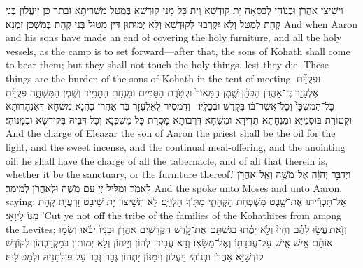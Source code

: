 {וִישֵׁיצֵי אַהֲרֹן וּבְנוֹהִי לְכַסָּאָה יָת קוּדְשָׁא וְיָת כָּל מָנֵי קוּדְשָׁא בְּמִטַּל מַשְׁרִיתָא וּבָתַר כֵּן יֵיעֲלוּן בְּנֵי קְהָת לְמִטַּל וְלָא יִקְרְבוּן לְקוּדְשָׁא וְלָא יְמוּתוּן דֵּין מַטוּל בְּנֵי קְהָת בְּמַשְׁכַּן זִמְנָא׃}
{And when Aaron and his sons have made an end of covering the holy furniture, and all the holy vessels, as the camp is to set forward—after that, the sons of Kohath shall come to bear them; but they shall not touch the holy things, lest they die. These things are the burden of the sons of Kohath in the tent of meeting.}{}
{וּפְקֻדַּ֞ת אֶלְעָזָ֣ר \legarmeh  בֶּן־אַהֲרֹ֣ן הַכֹּהֵ֗ן שֶׁ֤מֶן הַמָּאוֹר֙ וּקְטֹ֣רֶת הַסַּמִּ֔ים וּמִנְחַ֥ת הַתָּמִ֖יד וְשֶׁ֣מֶן הַמִּשְׁחָ֑ה פְּקֻדַּ֗ת כׇּל־הַמִּשְׁכָּן֙ וְכׇל־אֲשֶׁר־בּ֔וֹ בְּקֹ֖דֶשׁ וּבְכֵלָֽיו׃ \petucha 
{}}
{וְדִמְסִיר לְאֶלְעָזָר בַּר אַהֲרֹן כָּהֲנָא מִשְׁחָא דְּאַנְהָרוּתָא וּקְטוֹרֶת בּוּסְמַיָּא וּמִנְחָתָא תְּדִירָא וּמִשְׁחָא דִּרְבוּתָא מָסְרַת כָּל מַשְׁכְּנָא וְכָל דְּבֵיהּ בְּקוּדְשָׁא וּבְמָנוֹהִי׃}
{And the charge of Eleazar the son of Aaron the priest shall be the oil for the light, and the sweet incense, and the continual meal-offering, and the anointing oil: he shall have the charge of all the tabernacle, and of all that therein is, whether it be the sanctuary, or the furniture thereof.’}{}
{וַיְדַבֵּ֣ר יְהֹוָ֔ה אֶל־מֹשֶׁ֥ה וְאֶֽל־אַהֲרֹ֖ן לֵאמֹֽר׃}
{וּמַלֵּיל יְיָ עִם מֹשֶׁה וּלְאַהֲרֹן לְמֵימַר׃}
{And the \lord\space spoke unto Moses and unto Aaron, saying:}{}
{אַל־תַּכְרִ֕יתוּ אֶת־שֵׁ֖בֶט מִשְׁפְּחֹ֣ת הַקְּהָתִ֑י מִתּ֖וֹךְ הַלְוִיִּֽם׃
}
{לָא תְשֵׁיצוֹן יָת שֵׁיבַט זַרְעֲיָת קְהָת מִגּוֹ לֵיוָאֵי׃}
{’Cut ye not off the tribe of the families of the Kohathites from among the Levites;}{}
{וְזֹ֣את \legarmeh  עֲשׂ֣וּ לָהֶ֗ם וְחָיוּ֙ וְלֹ֣א יָמֻ֔תוּ בְּגִשְׁתָּ֖ם אֶת־קֹ֣דֶשׁ הַקֳּדָשִׁ֑ים אַהֲרֹ֤ן וּבָנָיו֙ יָבֹ֔אוּ וְשָׂמ֣וּ אוֹתָ֗ם אִ֥ישׁ אִ֛ישׁ עַל־עֲבֹדָת֖וֹ וְאֶל־מַשָּׂאֽוֹ׃}
{וְדָא עֲבִידוּ לְהוֹן וְיֵיחוֹן וְלָא יְמוּתוּן בְּמִקְרַבְהוֹן לְקוֹדֶשׁ קוּדְשַׁיָּא אַהֲרֹן וּבְנוֹהִי יֵיעֲלוּן וִימַנּוֹן יָתְהוֹן גְּבַר גְּבַר עַל פּוּלְחָנֵיהּ וּלְמַטוּלֵיהּ׃}
